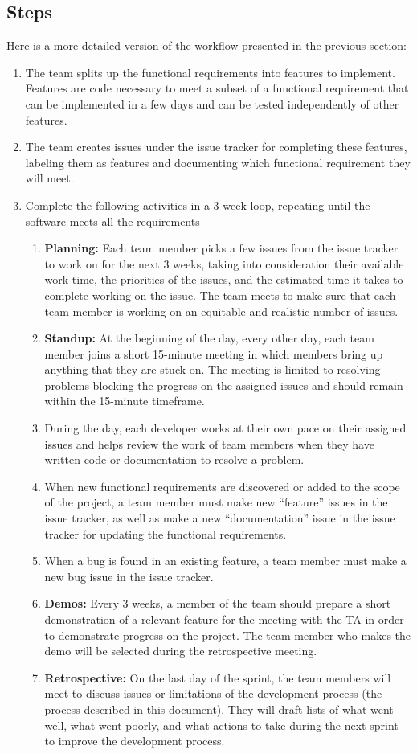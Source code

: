 \documentclass[fullpage]{article}
\newcommand{\be}{\begin{enumerate}}
\newcommand{\ee}{\end{enumerate}}
\begin{document}
\subsection{Steps}
Here is a more detailed version of the workflow presented in the previous section:
\be
\item The team splits up the functional requirements into features to implement. Features are code necessary to meet a subset of a functional requirement that can be implemented in a few days and can be tested independently of other features.
\item The team creates issues under the issue tracker for completing these features, labeling them as features and documenting which functional requirement they will meet.
\item Complete the following activities in a 3 week loop, repeating until the software meets all the requirements
\be
\item \textbf{Planning:} Each team member picks a few issues from the issue tracker to work on for the next 3 weeks, taking into consideration their available work time, the priorities of the issues, and the estimated time it takes to complete working on the issue. The team meets to make sure that each team member is working on an equitable and realistic number of issues.
\item \textbf{Standup:} At the beginning of the day, every other day, each team member joins a short 15-minute meeting in which members bring up anything that they are stuck on. The meeting is limited to resolving problems blocking the progress on the assigned issues and should remain within the 15-minute timeframe.
\item During the day, each developer works at their own pace on their assigned issues and helps review the work of team members when they have written code or documentation to resolve a problem.
\item When new functional requirements are discovered or added to the scope of the project, a team member must make new “feature” issues in the issue tracker, as well as make a new “documentation” issue in the issue tracker for updating the functional requirements.
\item When a bug is found in an existing feature, a team member must make a new bug issue in the issue tracker.
\item \textbf{Demos:} Every 3 weeks, a member of the team should prepare a short demonstration of a relevant feature for the meeting with the TA in order to demonstrate progress on the project. The team member who makes the demo will be selected during the retrospective meeting.
\item \textbf{Retrospective:} On the last day of the sprint, the team members will meet to discuss issues or limitations of the development process (the process described in this document). They will draft lists of what went well, what went poorly, and what actions to take during the next sprint to improve the development process.
\ee
\ee
\end{document}
